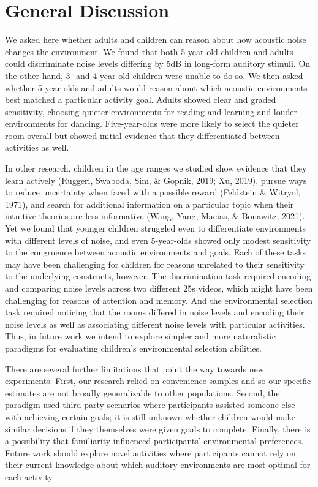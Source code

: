 \documentclass[10pt, letterpaper]{article}
\begin{document}
\hypertarget{general-discussion}{%
\section{General Discussion}\label{general-discussion}}

We asked here whether adults and children can reason about how acoustic
noise changes the environment. We found that both 5-year-old children
and adults could discriminate noise levels differing by 5dB in long-form
auditory stimuli. On the other hand, 3- and 4-year-old children were
unable to do so. We then asked whether 5-year-olds and adults would
reason about which acoustic environments best matched a particular
activity goal. Adults showed clear and graded sensitivity, choosing
quieter environments for reading and learning and louder environments
for dancing. Five-year-olds were more likely to select the quieter room
overall but showed initial evidence that they differentiated between
activities as well.

In other research, children in the age ranges we studied show evidence
that they learn actively (Ruggeri, Swaboda, Sim, \& Gopnik, 2019; Xu,
2019), pursue ways to reduce uncertainty when faced with a possible
reward (Feldstein \& Witryol, 1971), and search for additional
information on a particular topic when their intuitive theories are less
informative (Wang, Yang, Macias, \& Bonawitz, 2021). Yet we found that
younger children struggled even to differentiate environments with
different levels of noise, and even 5-year-olds showed only modest
sensitivity to the congruence between acoustic environments and goals.
Each of these tasks may have been challenging for children for reasons
unrelated to their sensitivity to the underlying constructs, however.
The discrimination task required encoding and comparing noise levels
across two different 25s videos, which might have been challenging for
reasons of attention and memory. And the environmental selection task
required noticing that the rooms differed in noise levels and encoding
their noise levels as well as associating different noise levels with
particular activities. Thus, in future work we intend to explore simpler
and more naturalistic paradigms for evaluating children's environmental
selection abilities.

There are several further limitations that point the way towards new
experiments. First, our research relied on convenience samples and so
our specific estimates are not broadly generalizable to other
populations. Second, the paradigm used third-party scenarios where
participants assisted someone else with achieving certain goals; it is
still unknown whether children would make similar decisions if they
themselves were given goals to complete. Finally, there is a possibility
that familiarity influenced participants' environmental preferences.
Future work should explore novel activities where participants cannot
rely on their current knowledge about which auditory environments are
most optimal for each activity.
\end{document}
